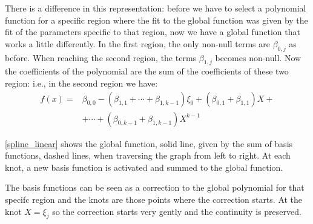 \documentclass[12pt, letterpaper]{article}
\theoremstyle{definition}
\begin{document}
There is a difference in this representation: before we have to select a polynomial function for a specific region where the fit to the global function was given by the fit of the parameters specific to that region, now we have a global function that works a little differently. In the first region, the only non-null terms are $\beta_{0,j}$ as before. When reaching the second region, the terms $\beta_{1,j}$ becomes non-null. Now the coefficients of the polynomial are the sum of the coefficients of these two region: i.e., in the second region we have:
\begin{equation}
\begin{aligned}
f(x) =& \beta_{0,0} -(\beta_{1,1}+\cdots+\beta_{1,k-1})\xi_0+ (\beta_{0,1}+\beta_{1,1})X+\\
&+\cdots+(\beta_{0,k-1}  +\beta_{1,k-1})X^{k-1}
\end{aligned}
\end{equation}

\ref{spline_linear} shows the global function, solid line, given by the sum of basis functions, dashed lines, when traversing the graph from left to right. At each knot, a new basis function is activated and summed to the global function.

The basis functions can be seen as a correction to the global polynomial for that  specifc region and the knots are those points where the correction starts. At the knot $X=\xi_j$ so the correction starts very gently and the continuity is preserved.
\end{document}
